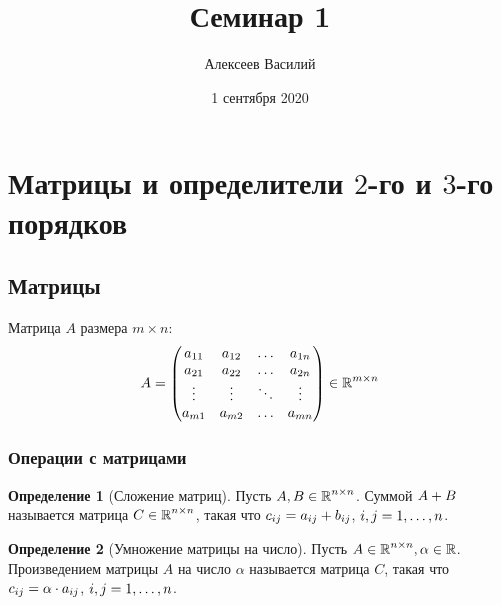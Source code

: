 \documentclass[a4paper,12pt]{article}
\author{Алексеев Василий}
\title{Семинар 1}
\date{1 сентября 2020}
\theoremstyle{definition}
\newtheorem{definition}{Определение}[section]
\theoremstyle{remark}
\theoremstyle{remark}
\begin{document}
  \maketitle
  \tableofcontents
  \thispagestyle{empty}
  
  \newpage
  




  \section{Матрицы и определители $2$-го и $3$-го порядков}

  \subsection{Матрицы}

  Матрица $A$ размера $m \times n$:
  \[
    A = \begin{pmatrix}
      a_{11} & a_{12} & \ldots & a_{1n}\\
      a_{21} & a_{22} & \ldots & a_{2n}\\
      \vdots & \vdots & \ddots & \vdots\\
      a_{m1} & a_{m2} & \ldots & a_{mn}
    \end{pmatrix} \in \operatorname{\mathbb R}^{m \times n}
  \]
  
  
  \subsubsection{Операции с матрицами}
  
  \begin{definition}[Сложение матриц]
    Пусть $A, B \in \operatorname{\mathbb R}^{n \times n}$.
    Суммой $A \hm+ B$ называется матрица $C \hm\in \RR^{n \times n}$, такая что
    $c_{ij} \hm= a_{ij} + b_{ij}$, $i, j \hm= 1, \ldots, n$.
  \end{definition}
  
  \begin{definition}[Умножение матрицы на число]
    Пусть $A \in \operatorname{\mathbb R}^{n \times n}, \alpha \in \operatorname{\mathbb R}$.
    Произведением матрицы $A$ на число $\alpha$ называется матрица $C$, такая что
    $c_{ij} \hm= \alpha \cdot a_{ij}$, $i, j \hm= 1, \ldots, n$.
  \end{definition}
  
\end{document}

